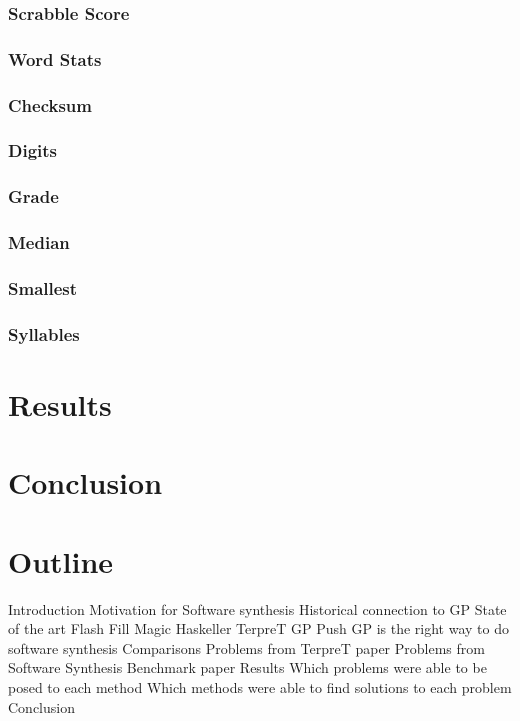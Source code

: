 \subsubsection{Scrabble Score}
\subsubsection{Word Stats}
\subsubsection{Checksum}
\subsubsection{Digits}
\subsubsection{Grade}
\subsubsection{Median}
\subsubsection{Smallest}
\subsubsection{Syllables}

\section{Results}

\section{Conclusion}


\section{Outline}

\begin{outline}
 \1 Introduction
   \2 Motivation for Software synthesis
   \2 Historical connection to GP
 \1 State of the art
  \2 Flash Fill
  \2 Magic Haskeller
  \2 TerpreT
  \2 GP
   \3 Push GP is the right way to do software synthesis
 \1 Comparisons
  \2 Problems from TerpreT paper
  \2 Problems from Software Synthesis Benchmark paper
 \1 Results
  \2 Which problems were able to be posed to each method
  \2 Which methods were able to find solutions to each problem
 \1 Conclusion
\end{outline}

